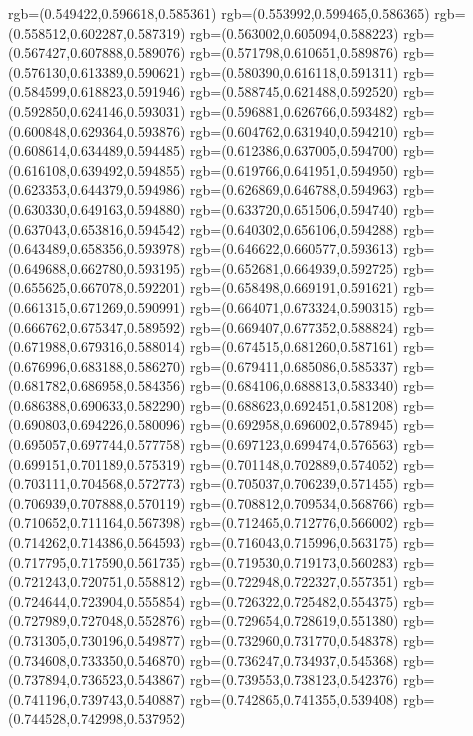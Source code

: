 {{{			rgb=(0.549422,0.596618,0.585361)
			rgb=(0.553992,0.599465,0.586365)
			rgb=(0.558512,0.602287,0.587319)
			rgb=(0.563002,0.605094,0.588223)
			rgb=(0.567427,0.607888,0.589076)
			rgb=(0.571798,0.610651,0.589876)
			rgb=(0.576130,0.613389,0.590621)
			rgb=(0.580390,0.616118,0.591311)
			rgb=(0.584599,0.618823,0.591946)
			rgb=(0.588745,0.621488,0.592520)
			rgb=(0.592850,0.624146,0.593031)
			rgb=(0.596881,0.626766,0.593482)
			rgb=(0.600848,0.629364,0.593876)
			rgb=(0.604762,0.631940,0.594210)
			rgb=(0.608614,0.634489,0.594485)
			rgb=(0.612386,0.637005,0.594700)
			rgb=(0.616108,0.639492,0.594855)
			rgb=(0.619766,0.641951,0.594950)
			rgb=(0.623353,0.644379,0.594986)
			rgb=(0.626869,0.646788,0.594963)
			rgb=(0.630330,0.649163,0.594880)
			rgb=(0.633720,0.651506,0.594740)
			rgb=(0.637043,0.653816,0.594542)
			rgb=(0.640302,0.656106,0.594288)
			rgb=(0.643489,0.658356,0.593978)
			rgb=(0.646622,0.660577,0.593613)
			rgb=(0.649688,0.662780,0.593195)
			rgb=(0.652681,0.664939,0.592725)
			rgb=(0.655625,0.667078,0.592201)
			rgb=(0.658498,0.669191,0.591621)
			rgb=(0.661315,0.671269,0.590991)
			rgb=(0.664071,0.673324,0.590315)
			rgb=(0.666762,0.675347,0.589592)
			rgb=(0.669407,0.677352,0.588824)
			rgb=(0.671988,0.679316,0.588014)
			rgb=(0.674515,0.681260,0.587161)
			rgb=(0.676996,0.683188,0.586270)
			rgb=(0.679411,0.685086,0.585337)
			rgb=(0.681782,0.686958,0.584356)
			rgb=(0.684106,0.688813,0.583340)
			rgb=(0.686388,0.690633,0.582290)
			rgb=(0.688623,0.692451,0.581208)
			rgb=(0.690803,0.694226,0.580096)
			rgb=(0.692958,0.696002,0.578945)
			rgb=(0.695057,0.697744,0.577758)
			rgb=(0.697123,0.699474,0.576563)
			rgb=(0.699151,0.701189,0.575319)
			rgb=(0.701148,0.702889,0.574052)
			rgb=(0.703111,0.704568,0.572773)
			rgb=(0.705037,0.706239,0.571455)
			rgb=(0.706939,0.707888,0.570119)
			rgb=(0.708812,0.709534,0.568766)
			rgb=(0.710652,0.711164,0.567398)
			rgb=(0.712465,0.712776,0.566002)
			rgb=(0.714262,0.714386,0.564593)
			rgb=(0.716043,0.715996,0.563175)
			rgb=(0.717795,0.717590,0.561735)
			rgb=(0.719530,0.719173,0.560283)
			rgb=(0.721243,0.720751,0.558812)
			rgb=(0.722948,0.722327,0.557351)
			rgb=(0.724644,0.723904,0.555854)
			rgb=(0.726322,0.725482,0.554375)
			rgb=(0.727989,0.727048,0.552876)
			rgb=(0.729654,0.728619,0.551380)
			rgb=(0.731305,0.730196,0.549877)
			rgb=(0.732960,0.731770,0.548378)
			rgb=(0.734608,0.733350,0.546870)
			rgb=(0.736247,0.734937,0.545368)
			rgb=(0.737894,0.736523,0.543867)
			rgb=(0.739553,0.738123,0.542376)
			rgb=(0.741196,0.739743,0.540887)
			rgb=(0.742865,0.741355,0.539408)
			rgb=(0.744528,0.742998,0.537952)
}}}
